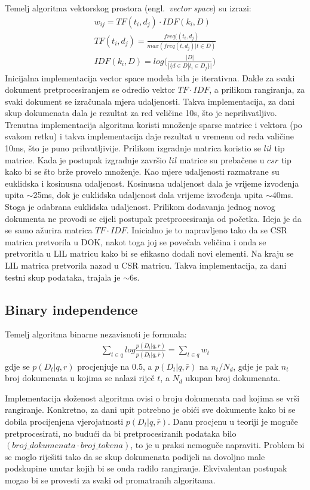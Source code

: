 \documentclass[a4paper,12pt]{article}
\newcommand{\engl}[1]{(engl.~\emph{#1})}
\begin{document}
Temelj algoritma vektorskog prostora \engl{vector space} su izrazi:
\begin{align}
w_{ij} = TF(t_i , d_j) \cdot IDF(k_i , D) \\
TF(t_i , d_j) = \frac{freq((t_i , d_j)}{max(freq(t, d_j) | t \in D)} \\
IDF(k_i, D) = log\Big(\frac{|D|}{|\{d \in D | t_i \in D_j\}|}\Big)
\end{align}
Inicijalna implementacija vector space modela bila je iterativna. Dakle za svaki dokument pretprocesiranjem se odredio vektor $TF \cdot IDF$, a prilikom rangiranja, za svaki dokument se izračunala mjera udaljenosti. Takva implementacija, za dani skup dokumenata dala je rezultat za red veličine 10s, što je neprihvatljivo. Trenutna implementacija algoritma koristi množenje sparse matrice i vektora (po svakom retku) i takva implementacija daje rezultat u vremenu od reda valičine 10ms, što je puno prihvatljivije. Prilikom izgradnje matrica koristio se $lil$ tip matrice. Kada je postupak izgradnje završio $lil$ matrice su prebačene u $csr$ tip kako bi se što brže provelo množenje. Kao mjere udaljenosti razmatrane su euklidska i kosinusna udaljenost. Kosinusna udaljenost dala je vrijeme izvođenja upita $\sim$25ms, dok je euklidska udaljenost dala vrijeme izvođenja upita $\sim$40ms. Stoga je odabrana euklidska udaljenost. Prilikom dodavanja jednog novog dokumenta ne provodi se cijeli postupak pretprocesiranja od početka. Ideja je da se samo ažurira matrica $TF \cdot IDF$. Inicialno je to napravljeno tako da se CSR matrica pretvorila u DOK, nakot toga joj se povečala veličina i onda se pretvoritla u LIL matricu kako bi se efikasno dodali novi elementi. Na kraju se LIL matrica pretvorila nazad u CSR matricu. Takva implementacija, za dani testni skup podataka, trajala je $\sim$6s.

\subsection{Binary independence}

Temelj algoritma binarne nezavisnoti je formuala:
\begin{align}
\sum_{t \in q} log \frac{p(D_t|q, r)}{p(D_t|q, \bar r)} = \sum_{t \in q} w_t
\end{align}
gdje se $p(D_t|q, r)$ procjenjuje na $0.5$, a $p(D_t|q, \bar r)$ na $n_t / N_d$, gdje je pak $n_t$ broj dokumenata u kojima se nalazi riječ $t$, a $N_d$ ukupan broj dokumenata.

Implementacija složenost algoritma ovisi o broju dokumenata nad kojima se vrši rangiranje. Konkretno, za dani upit potrebno je obići sve dokumente kako bi se dobila procijenjena vjerojatnosti $p(D_t|q, \bar r)$. Danu procjenu u teoriji je moguče pretprocesirati, no budući da bi pretprocesiranih podataka bilo $(broj\_dokumenata \cdot broj\_tokena)$, to je u praksi nemoguče napraviti. Problem bi se moglo riješiti tako da se skup dokumenata podijeli na dovoljno male podskupine unutar kojih bi se onda radilo rangiranje. Ekvivalentan postupak mogao bi se provesti za svaki od promatranih algoritama.
\end{document}
